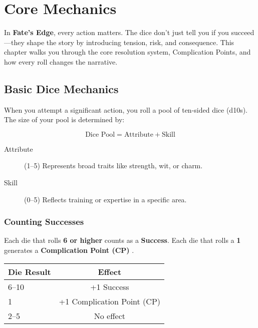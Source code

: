 
\chapter{Core Mechanics}
\label{ch:core-mechanics}

In \textbf{Fate's Edge}, every action matters. The dice don't just tell you if you succeed—they shape the story by introducing tension, risk, and consequence. This chapter walks you through the core resolution system, Complication Points, and how every roll changes the narrative.

\section{Basic Dice Mechanics}

When you attempt a significant action, you roll a pool of ten-sided dice (d10s). The size of your pool is determined by:

\[
\text{Dice Pool} = \text{Attribute} + \text{Skill}
\]

\begin{description}
  \item[Attribute]  (1–5) Represents broad traits like strength, wit, or charm.
  \item[Skill]  (0–5) Reflects training or expertise in a specific area.
\end{description}

\subsection*{Counting Successes}

Each die that rolls \textbf{6 or higher} counts as a \textbf{Success}. Each die that rolls a \textbf{1} generates a \textbf{Complication Point (CP)} .

\begin{center}
\begin{tabular}{lc}
\toprule
\textbf{Die Result} & \textbf{Effect} \\
\midrule
6–10 & +1 Success \\
1 & +1 Complication Point (CP) \\
2–5 & No effect \\
\bottomrule
\end{tabular}
\end{center}

